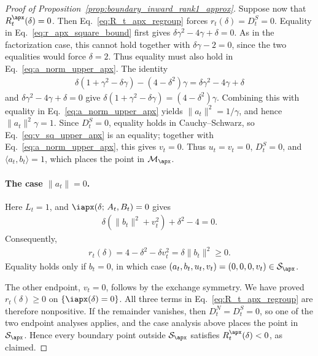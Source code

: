 \documentclass{article}
\begin{document}
\begin{proof}[Proof of Proposition~\ref{prop:boundary_inward_rank1_approx}]
Suppose now that $R_t^\apx(\delta)=0$. Then
Eq.~\eqref{eq:R_t_apx_regroup} forces $r_t(\delta)=D_t^S=0$.
Equality in Eq.~\eqref{eq:r_apx_square_bound} first gives
$\delta\gamma^2-4\gamma+\delta=0$. As in the factorization case, this cannot
hold together with $\delta\gamma-2=0$, since the two equalities would force
$\delta=2$. Thus equality must also hold in Eq.~\eqref{eq:a_norm_upper_apx}.
The identity
\begin{align}
    \delta(1+\gamma^2-\delta\gamma)
    -(4-\delta^2)\gamma
    =\delta\gamma^2-4\gamma+\delta
\end{align}
and $\delta\gamma^2-4\gamma+\delta=0$ give
$\delta(1+\gamma^2-\delta\gamma)=(4-\delta^2)\gamma$. Combining this with
equality in Eq.~\eqref{eq:a_norm_upper_apx} yields
$\|a_t\|^2=1/\gamma$, and hence $\|a_t\|^2\gamma=1$. Since $D_t^S=0$,
equality holds in Cauchy--Schwarz, so Eq.~\eqref{eq:v_sq_upper_apx} is an
equality; together with
Eq.~\eqref{eq:a_norm_upper_apx}, this gives $v_t=0$. Thus $u_t=v_t=0$,
$D_t^S=0$, and $\langle a_t,b_t\rangle=1$, which places the point in
$\mathcal M_\apx$.

\paragraph{The case $\|a_t\|=0$.}
Here $L_t=1$, and $\iapx(\delta;\,A_t,B_t)=0$ gives
\begin{align}
    \delta(\|b_t\|^2+v_t^2)+\delta^2-4=0.
\end{align}
Consequently,
\begin{align}
    r_t(\delta)
    =4-\delta^2-\delta v_t^2
    =\delta\|b_t\|^2\ge0.
\end{align}
Equality holds only if $b_t=0$, in which case
$(a_t,b_t,u_t,v_t)=(0,0,0,v_t)\in\mathcal S_\apx$.

The other endpoint, $v_t=0$, follows by the exchange symmetry. We have proved
$r_t(\delta)\ge0$ on $\{\iapx(\delta)=0\}$. All three terms in
Eq.~\eqref{eq:R_t_apx_regroup} are therefore nonpositive. If the remainder
vanishes, then $D_t^N=D_t^S=0$, so one of the two endpoint analyses applies,
and the case analysis above places the point in $\mathcal S_\apx$. Hence every
boundary point outside $\mathcal S_\apx$ satisfies $R_t^\apx(\delta)<0$, as claimed.
\end{proof}

\end{document}
